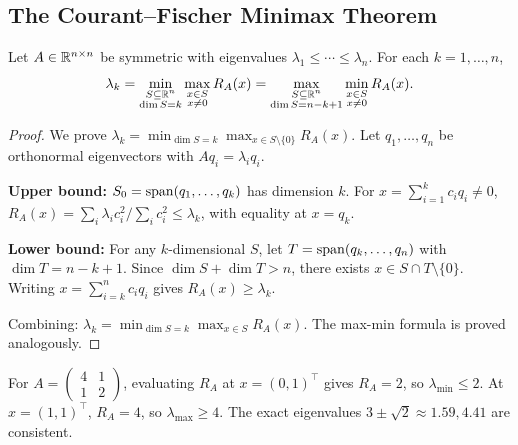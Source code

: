 \documentclass[11pt,a4paper]{article}
\begin{document}
\subsection{The Courant--Fischer Minimax Theorem}

\begin{theorem}
\label{thm:courant_fischer}
Let $A \in \mathbb{R}^{n \times n}$ be symmetric with eigenvalues
$\lambda_1 \leq \cdots \leq \lambda_n$.  For each $k = 1, \ldots, n$,
\[
  \lambda_k = \min_{\substack{S \subseteq \mathbb{R}^n \\ \dim S = k}}
              \max_{\substack{x \in S \\ x \neq 0}} R_A(x)
            = \max_{\substack{S \subseteq \mathbb{R}^n \\ \dim S = n-k+1}}
              \min_{\substack{x \in S \\ x \neq 0}} R_A(x).
\]
\end{theorem}

\begin{proof}
We prove $\lambda_k = \min_{\dim S = k} \max_{x \in S \setminus \{0\}} R_A(x)$.
Let $q_1, \ldots, q_n$ be orthonormal eigenvectors with $Aq_i = \lambda_i q_i$.

\textbf{Upper bound:} $S_0 = \operatorname{span}(q_1, \ldots, q_k)$ has dimension $k$.
For $x = \sum_{i=1}^k c_i q_i \neq 0$,
$R_A(x) = \sum_i \lambda_i c_i^2 / \sum_i c_i^2 \leq \lambda_k$, with
equality at $x = q_k$.

\textbf{Lower bound:} For any $k$-dimensional $S$, let
$T = \operatorname{span}(q_k, \ldots, q_n)$ with $\dim T = n - k + 1$.  Since
$\dim S + \dim T > n$, there exists $x \in S \cap T \setminus \{0\}$.
Writing $x = \sum_{i=k}^n c_i q_i$ gives $R_A(x) \geq \lambda_k$.

Combining: $\lambda_k = \min_{\dim S = k} \max_{x \in S} R_A(x)$.
The max-min formula is proved analogously.
\end{proof}

\begin{example}
\label{ex:rayleigh_bound}
For $A = \begin{pmatrix} 4 & 1 \\ 1 & 2 \end{pmatrix}$, evaluating
$R_A$ at $x = (0,1)^\top$ gives $R_A = 2$, so $\lambda_{\min} \leq 2$.
At $x = (1,1)^\top$, $R_A = 4$, so $\lambda_{\max} \geq 4$.  The exact
eigenvalues $3 \pm \sqrt{2} \approx 1.59, 4.41$ are consistent.
\end{example}
\end{document}
